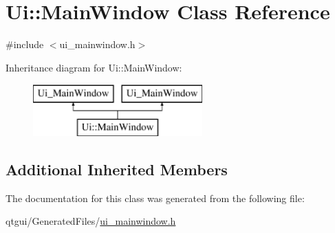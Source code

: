 \hypertarget{class_ui_1_1_main_window}{}\section{Ui\+::Main\+Window Class Reference}
\label{class_ui_1_1_main_window}


{\ttfamily \#include $<$ui\+\_\+mainwindow.\+h$>$}

Inheritance diagram for Ui\+::Main\+Window\+:\begin{figure}[H]
\begin{center}
\leavevmode
\includegraphics[height=2.000000cm]{d4/d4a/class_ui_1_1_main_window}
\end{center}
\end{figure}
\subsection*{Additional Inherited Members}


The documentation for this class was generated from the following file\+:\begin{DoxyCompactItemize}
\item 
qtgui/\+Generated\+Files/\mbox{\hyperlink{qtgui_2_generated_files_2ui__mainwindow_8h}{ui\+\_\+mainwindow.\+h}}\end{DoxyCompactItemize}
